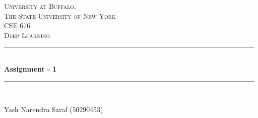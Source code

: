 \begin{titlepage}

\newcommand{\HRule}{\rule{\linewidth}{0.5mm}} %

\center %
 
\vspace*{150px}
\textsc{\LARGE University at Buffalo, \\The State University of New York}\\[1.5cm] %
\textsc{\large CSE 676}\\[0.5cm] %
\textsc{\large Deep Learning}\\[0.5cm] %


\HRule \\[0.4cm]
{ \LARGE \bfseries Assignment - 1}\\[0.4cm] %
\HRule \\[1.5cm]
 

\begin{center}
\Large Yash Narendra Saraf (50290453)\\
\end{center}





\end{titlepage}
